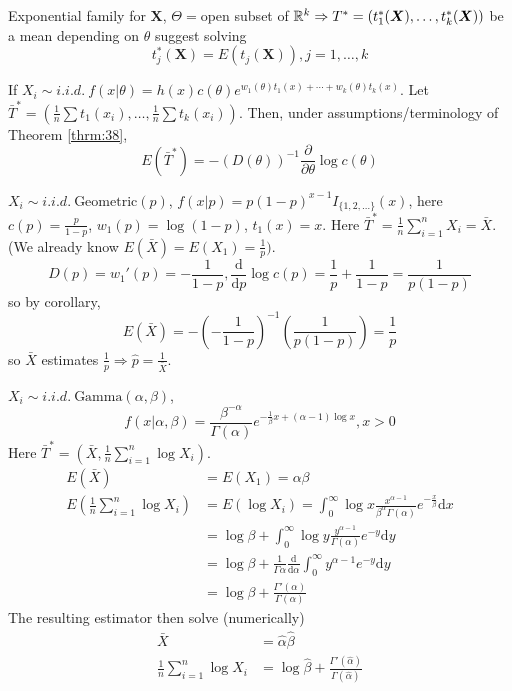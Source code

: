 \documentclass[english, 11pt]{article}
\begin{document}
Exponential family for $\bm{X}$, $\Theta=$open subset of ${\mathbb{R}}^k\Rightarrow T^*=(t_1^*(\bm{X}), \dots, t_k^*(\bm{X}))$ be a mean depending on $\theta$ suggest solving
$$
t_j^*(\bm{X})=E(t_j(\bm{X})), j=1, \dots, k
$$

\begin{cor}\label{cor:39}
If $X_i\sim i.i.d.~f(x|\theta)=h(x)c(\theta)e^{w_1(\theta)t_1(x)+\cdots+w_k(\theta)t_k(x)}$. Let $\bar{T}^*=\left(\frac{1}{n}\sum t_1(x_i), \dots, \frac{1}{n}\sum t_k(x_i)\right)$. Then, under assumptions/terminology of Theorem \ref{thrm:38}, 
$$
E(\bar{T}^*)=-(D(\theta))^{-1}\frac{\partial}{\partial \theta}\log c(\theta)
$$
\end{cor}


\begin{exmp}\label{exmp:310}
$X_i\sim i.i.d.~\text{Geometric}(p)$, $f(x|p)=p(1-p)^{x-1}I_{\{1, 2, \dots\}}(x)$, here $c(p)=\frac{p}{1-p}$, $w_1(p)=\log(1-p)$, $t_1(x)=x$. Here $\bar{T}^*=\frac{1}{n}\sum_{i=1}^nX_i=\bar{X}$. (We already know $E(\bar{X})=E(X_1)=\frac{1}{p})$. 
$$
D(p)=w_1'(p)=-\frac{1}{1-p}, \frac{\mathrm{d}}{\mathrm{d}p}\log c(p)=\frac{1}{p}+\frac{1}{1-p}=\frac{1}{p(1-p)}
$$
so by corollary, 
$$
E(\bar{X})=-\left(-\frac{1}{1-p}\right)^{-1}\left(\frac{1}{p(1-p)}\right)=\frac{1}{p}
$$
so $\bar{X}$ estimates $\frac{1}{p}\Rightarrow \hat{p}=\frac{1}{\bar{X}}$.
\end{exmp}

\begin{exmp}
$X_i\sim i.i.d.~\text{Gamma}(\alpha, \beta)$, 
$$
f(x|\alpha, \beta)=\frac{\beta^{-\alpha}}{\Gamma(\alpha)}e^{-\frac{1}{\beta}x+(\alpha-1)\log x}, x>0
$$
Here $\bar{T}^*=(\bar{X}, \frac{1}{n}\sum_{i=1}^n\log X_i)$.
$$
\begin{aligned}
E(\bar{X})&=E(X_1)=\alpha\beta\\
E\left(\frac{1}{n}\sum_{i=1}^n\log X_i\right)&=E(\log X_i)=\int_0^\infty\log x\frac{x^{\alpha-1}}{\beta^\alpha\Gamma(\alpha)}e^{-\frac{x}{\beta}}\mathrm{d}x\\
&=\log\beta+\int_0^\infty\log y\frac{y^{\alpha-1}}{\Gamma(\alpha)}e^{-y}\mathrm{d}y\\
&=\log\beta+\frac{1}{\Gamma{\alpha}}\frac{\mathrm{d}}{\mathrm{d}\alpha}\int_0^\infty y^{\alpha-1}e^{-y}\mathrm{d}y\\
&=\log\beta+\frac{\Gamma'(\alpha)}{\Gamma(\alpha)}
\end{aligned}
$$
The resulting estimator then solve (numerically)
$$\begin{aligned}
\bar{X}&=\hat{\alpha}\hat{\beta}\\
\frac{1}{n}\sum_{i=1}^n\log X_i&=\log\hat{\beta}+\frac{\Gamma'(\hat{\alpha})}{\Gamma(\hat{\alpha})}
\end{aligned}$$
\end{exmp}
\end{document}
